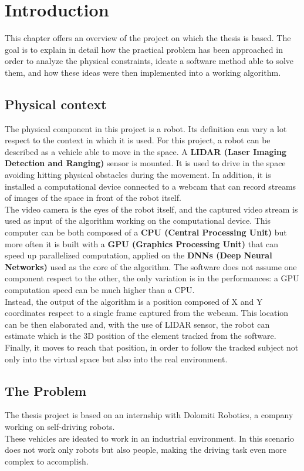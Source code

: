 \chapter{Introduction} \label{cha:introduction}
This chapter offers an overview of the project on which the thesis is based. The goal is to explain in detail how the practical problem has been approached in order to analyze the physical constraints, ideate a software method able to solve them, and how these ideas were then implemented into a working algorithm. 


\section{Physical context}
The physical component in this project is a robot. Its definition can vary a lot respect to the context in which it is used. For this project, a robot can be described as a vehicle able to move in the space. A \textbf{LIDAR (Laser Imaging Detection and Ranging)} sensor is mounted. It is used to drive in the space avoiding hitting physical obstacles during the movement. In addition, it is installed a computational device connected to a webcam that can record streams of images of the space in front of the robot itself.\\
The video camera is the eyes of the robot itself, and the captured video stream is used as input of the algorithm working on the computational device. This computer can be both composed of a \textbf{CPU (Central Processing Unit)} but more often it is built with a \textbf{GPU (Graphics Processing Unit)} that can speed up parallelized computation, applied on the \textbf{DNNs (Deep Neural Networks)} used as the core of the algorithm. The software does not assume one component respect to the other, the only variation is in the performances: a GPU computation speed can be much higher than a CPU.\\
Instead, the output of the algorithm is a position composed of X and Y coordinates respect to a single frame captured from the webcam. This location can be then elaborated and, with the use of LIDAR sensor, the robot can estimate which is the 3D position of the element tracked from the software.\\
Finally, it moves to reach that position, in order to follow the tracked subject not only into the virtual space but also into the real environment.


\section{The Problem}
The thesis project is based on an internship with Dolomiti Robotics\cite{dolomitiRobotics}, a company working on self-driving robots.\\
These vehicles are ideated to work in an industrial environment. In this scenario does not work only robots but also people, making the driving task even more complex to accomplish.

